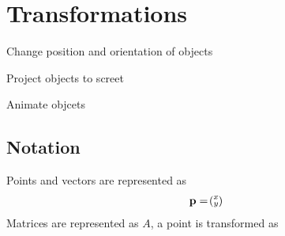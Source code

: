 \chapter{Transformations}
\begin{enumerate*}[label=\protect\circled{\arabic*},itemjoin=]
	\item Change position and orientation of objects\\
	\item Project objects to screet\\
	\item Animate objcets
\end{enumerate*}
\section{Notation}
Points and vectors are represented as
\begin{gather*}
	\bm{\mathrm{p}}=
	\!\left(\!\begin{smallmatrix}
		x\\
		y
	\end{smallmatrix}\!\right)\!
\end{gather*}
Matrices are represented as $A$, a point is transformed as 
